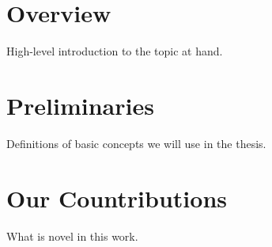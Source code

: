 
\section{Overview}

High-level introduction to the topic at hand.

\section{Preliminaries}

Definitions of basic concepts we will use in the thesis. 


\section{Our Countributions}

What is novel in this work.
